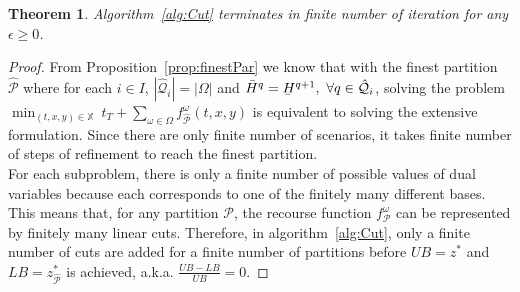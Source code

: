 \documentclass[11pt]{article}
\newtheorem{theorem}{Theorem}
\renewcommand{\underbar}{\underaccent{\bar}}
\begin{document}
	\begin{theorem} \label{thm:converge}
		Algorithm~\ref{alg:Cut} terminates in finite number of iteration for any \(\epsilon \geq 0\). 
	\end{theorem}
	\begin{proof}
		From Proposition~\ref{prop:finestPar} we know that with the finest partition \(\hat{\mathcal{P}}\) where for each \(i \in I\), \(|\hat{\mathcal{Q}}_i| = |\Omega|\) and \(\bar{H}^q = \underbar{H}^{q + 1},\ \forall q \in \hat{\mathcal{Q}}_i\), solving the problem \(\min_{(t,x,y) \in \mathbb{X}}\ t_T + \sum_{\omega \in \Omega} f^\omega_{\hat{\mathcal{P}}}(t,x,y)\) is equivalent to solving the extensive formulation. Since there are only finite number of scenarios, it takes finite number of steps of refinement to reach the finest partition. \\
		\newline
		For each subproblem, there is only a finite number of possible values of dual variables because each corresponds to one of the finitely many different bases. This means that, for any partition \(\mathcal{P}\), the recourse function \(f^\omega_{\mathcal{P}}\) can be represented by finitely many linear cuts. Therefore, in algorithm~\ref{alg:Cut}, only a finite number of cuts are added for a finite number of partitions before \(UB = z^*\) and \(LB = z^*_{\hat{\mathcal{P}}}\) is achieved, a.k.a. \(\frac{UB - LB}{UB} = 0\).
	\end{proof}
	
\end{document}
